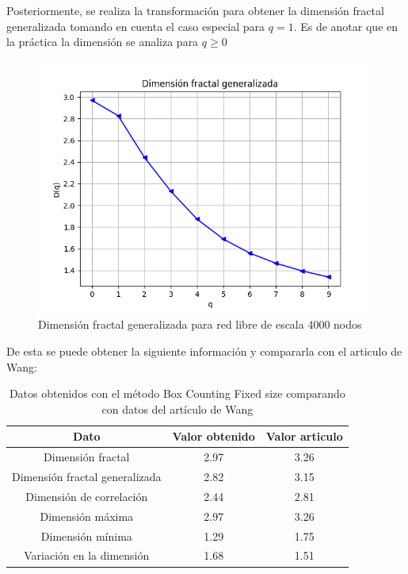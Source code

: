 Posteriormente, se realiza la transformación para obtener la dimensión fractal generalizada tomando en cuenta el caso especial para $q=1$. Es de anotar que en la práctica la dimensión se analiza para $q\geq0$

\begin{figure}[H]
    \centering
    \includegraphics[scale=0.7]{Capitulo4Multifractalidad/imagenes/scaleFree4000_DqscaleFree4000Nodes.png}
    \caption{Dimensión fractal generalizada para red libre de escala 4000 nodos}
\end{figure}

De esta se puede obtener la siguiente información y compararla con el articulo de Wang\cite{Wang2012}:

\begin{table}[H]
    \centering
    \begin{tabular}{|c|c|c|}
        \hline
         \textbf{Dato}& \textbf{Valor obtenido} & \textbf{Valor articulo} \\
         \hline
         Dimensión fractal & 2.97 & 3.26 \\
         \hline
         Dimensión fractal generalizada & 2.82 & 3.15 \\
         \hline
         Dimensión de correlación & 2.44 & 2.81 \\
         \hline
         Dimensión máxima & 2.97 & 3.26 \\
         \hline
         Dimensión mínima & 1.29 & 1.75 \\
         \hline
         Variación en la dimensión & 1.68 & 1.51 \\
         \hline
    \end{tabular}
    \caption{Datos obtenidos con el método Box Counting Fixed size comparando con datos del artículo de Wang\cite{Wang2012}}
\end{table}

